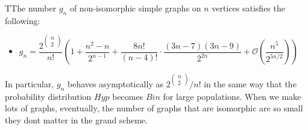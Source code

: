\begin{theo}
  TThe number $g_n$ of non-isomorphic simple graphs on $n$ vertices satisfies the following:\par
  \begin{itemize}
    \item $g_n = \dfrac{2^{\begin{pmatrix}n\\2\end{pmatrix}}}{n!}\left(1+\dfrac{n^2-n}{2^{n-1}}+\dfrac{8n!}{(n-4)!}\cdot\dfrac{(3n-7)(3n-9)}{2^{2n}}+\mathcal{O}\left(\dfrac{n^5}{2^{5n/2}}\right)\right)$
  \end{itemize}
  \par\bigskip
  \noindent In particular, $g_n$ behaves asymptotically as $2^{\begin{pmatrix}n\\2\end{pmatrix}}/n!$ in the same way that the probability distribution $Hyp$ becomes $Bin$ for large populations. When we make lots of graphs, eventually, the number of graphs that are isomorphic are so small they dont matter in the grand scheme.
\end{theo}
\par\bigskip
